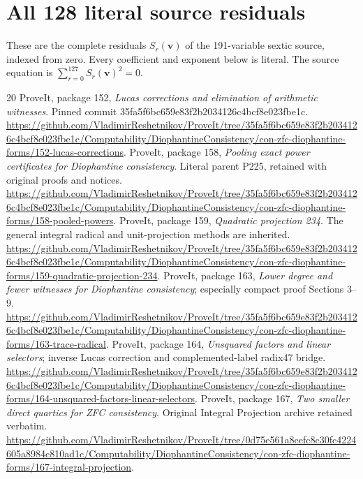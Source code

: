 \documentclass[11pt]{article}
\begin{document}
\section{All 128 literal source residuals}\label{app:source}

These are the complete residuals $S_r(\boldsymbol v)$ of the
191-variable sextic source, indexed from zero. Every coefficient
and exponent below is literal. The source equation is
$\sum_{r=0}^{127}S_r(\boldsymbol v)^2=0$.


\begin{thebibliography}{20}
 ProveIt, package 152, \emph{Lucas corrections and elimination
of arithmetic witnesses}. Pinned commit 35fa5f6bc659e83f2b2034126c4bcf8e023fbe1c.
\url{https://github.com/VladimirReshetnikov/ProveIt/tree/35fa5f6bc659e83f2b2034126c4bcf8e023fbe1c/Computability/DiophantineConsistency/con-zfc-diophantine-forms/152-lucas-corrections}.
 ProveIt, package 158, \emph{Pooling exact power certificates
for Diophantine consistency}. Literal parent P225, retained with original
proofs and notices. \url{https://github.com/VladimirReshetnikov/ProveIt/tree/35fa5f6bc659e83f2b2034126c4bcf8e023fbe1c/Computability/DiophantineConsistency/con-zfc-diophantine-forms/158-pooled-powers}.
 ProveIt, package 159, \emph{Quadratic projection 234}.
The general integral radical and unit-projection methods are inherited.
\url{https://github.com/VladimirReshetnikov/ProveIt/tree/35fa5f6bc659e83f2b2034126c4bcf8e023fbe1c/Computability/DiophantineConsistency/con-zfc-diophantine-forms/159-quadratic-projection-234}.
 ProveIt, package 163, \emph{Lower degree and fewer witnesses
for Diophantine consistency}; especially compact proof Sections 3--9.
\url{https://github.com/VladimirReshetnikov/ProveIt/tree/35fa5f6bc659e83f2b2034126c4bcf8e023fbe1c/Computability/DiophantineConsistency/con-zfc-diophantine-forms/163-trace-radical}.
 ProveIt, package 164, \emph{Unsquared factors and linear
selectors}; inverse Lucas correction and complemented-label radix47 bridge.
\url{https://github.com/VladimirReshetnikov/ProveIt/tree/35fa5f6bc659e83f2b2034126c4bcf8e023fbe1c/Computability/DiophantineConsistency/con-zfc-diophantine-forms/164-unsquared-factors-linear-selectors}.
 ProveIt, package 167, \emph{Two smaller direct quartics for
ZFC consistency}. Original Integral Projection archive retained verbatim.
\url{https://github.com/VladimirReshetnikov/ProveIt/tree/0d75e561a8cefc8c30fc4224605a8984c810ad1c/Computability/DiophantineConsistency/con-zfc-diophantine-forms/167-integral-projection}.

\end{thebibliography}
\end{document}
